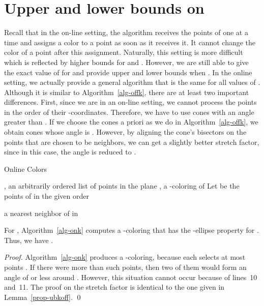 \documentclass[pdftex,leqno,fleqn,12pts]{llncs}
\begin{document}
\section{Upper and lower bounds on }
\label{section-online}
 
Recall that in the on-line setting, the algorithm 
receives the points of  one at a time and assigns a color to a point as soon as it receives it.
It cannot change the color of a point after this assignment. Naturally, this setting is more difficult which is
reflected by higher bounds for  and . However, we are still able to give the exact value of  
for  and provide upper and lower bounds when .
In the online setting, we actually provide a general algorithm that is the same 
for all values of . Although it is similar to 
Algorithm~\ref{alg-offk}, there are at least two important differences. 
First, since we are in an on-line setting, we cannot process the points 
in the order of their -coordinates. Therefore, we have to use cones 
with an angle greater than . If we choose the cones a priori as we do in 
Algorithm~\ref{alg-offk}, we obtain cones whose angle is . 
However, by aligning the cone's bisectors on the points that are chosen 
to be neighbors, we can get a slightly better stretch factor, since in this case, the angle
is reduced to . 

\begin{algorithm}
\caption{Online  Colors}\label{alg-onk}
\begin{algorithmic}[1]
\REQUIRE , an arbitrarily ordered list of points in the plane
\ENSURE , a -coloring of 
\STATE Let  be the points of  in the given order
\STATE 
\STATE 
\WHILE{}

\STATE 

\STATE  a nearest neighbor of  in 

\STATE 


\IF{}

\STATE 

\ENDIF

\ENDFOR

\ENDWHILE

\STATE 

\ENDFOR
\end{algorithmic}
\end{algorithm}


\begin{lemma} \label{prop-ubkon}
For , Algorithm~\ref{alg-onk} computes a -coloring that has 
the -ellipse property for .
Thus, we have .
\end{lemma}
\begin{proof}
Algorithm~\ref{alg-onk} produces a -coloring, because each 
selects at most  points . If there were more than 
such points, then two of them would form an angle of  or
less around . However, this situation cannot occur because of
lines~10 and~11. The proof on the stretch factor is 
identical to the one given in
Lemma~\ref{prop-ubkoff}.
\qed 
\end{proof}
\end{document}
